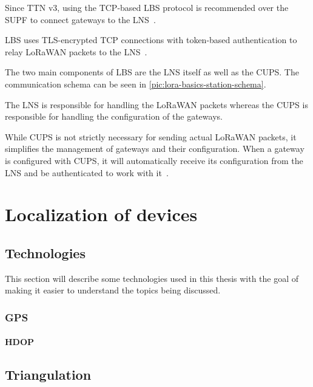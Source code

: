 Since \ac{TTN} v3, using the \ac{TCP}-based \acl{LBS} protocol is recommended over the \ac{SUPF} to connect gateways to the \ac{LNS}~\cite{the_things_industries_bv_semtech_2022}.

\ac{LBS} uses \ac{TLS}-encrypted \ac{TCP} connections with token-based authentication to relay \ac{LoRaWAN} packets to the \ac{LNS}~\cite{the_things_industries_bv_lora_2022}.

The two main components of \acl{LBS} are the \ac{LNS} itself as well as the \acf{CUPS}.
The communication schema can be seen in \cref{pic:lora-basics-station-schema}.

The \ac{LNS} is responsible for handling the \ac{LoRaWAN} packets whereas the \acl{CUPS} is responsible for handling the configuration of the gateways.

While \ac{CUPS} is not strictly necessary for sending actual \ac{LoRaWAN} packets, it simplifies the management of gateways and their configuration.
When a gateway is configured with \ac{CUPS}, it will automatically receive its configuration from the \ac{LNS} and be authenticated to work with it~\cite{the_things_industries_bv_lora_2022}.

\section{Localization of devices}

\subsection{Technologies}

This section will describe some technologies used in this thesis with the goal of making it easier to understand the topics being discussed.

\subsubsection{\ac{GPS}}


\paragraph{\ac{HDOP}}


\subsection{Triangulation}

